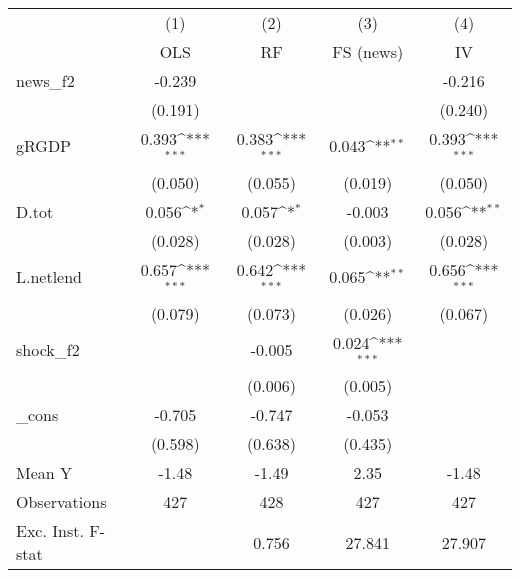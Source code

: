 {
\def\sym#1{\ifmmode^{#1}\else\(^{#1}\)\fi}
\begin{tabular}{l*{4}{c}}
\toprule
            &\multicolumn{1}{c}{(1)}&\multicolumn{1}{c}{(2)}&\multicolumn{1}{c}{(3)}&\multicolumn{1}{c}{(4)}\\
            &\multicolumn{1}{c}{OLS}&\multicolumn{1}{c}{RF}&\multicolumn{1}{c}{FS (news)}&\multicolumn{1}{c}{IV}\\
\midrule
news\_f2     &      -0.239         &                     &                     &      -0.216         \\
            &     (0.191)         &                     &                     &     (0.240)         \\
\addlinespace
gRGDP       &       0.393\sym{***}&       0.383\sym{***}&       0.043\sym{**} &       0.393\sym{***}\\
            &     (0.050)         &     (0.055)         &     (0.019)         &     (0.050)         \\
\addlinespace
D.tot       &       0.056\sym{*}  &       0.057\sym{*}  &      -0.003         &       0.056\sym{**} \\
            &     (0.028)         &     (0.028)         &     (0.003)         &     (0.028)         \\
\addlinespace
L.netlend   &       0.657\sym{***}&       0.642\sym{***}&       0.065\sym{**} &       0.656\sym{***}\\
            &     (0.079)         &     (0.073)         &     (0.026)         &     (0.067)         \\
\addlinespace
shock\_f2    &                     &      -0.005         &       0.024\sym{***}&                     \\
            &                     &     (0.006)         &     (0.005)         &                     \\
\addlinespace
\_cons      &      -0.705         &      -0.747         &      -0.053         &                     \\
            &     (0.598)         &     (0.638)         &     (0.435)         &                     \\
\midrule
Mean Y      &       -1.48         &       -1.49         &        2.35         &       -1.48         \\
Observations&         427         &         428         &         427         &         427         \\
Exc. Inst. F-stat&                     &       0.756         &      27.841         &      27.907         \\
\bottomrule
\end{tabular}
}
